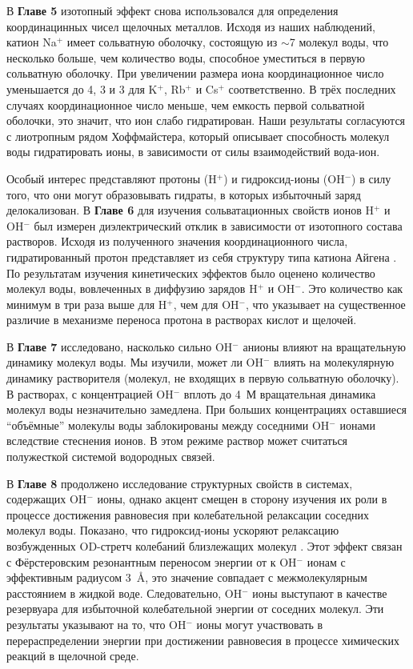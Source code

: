 В \textbf{Главе 5} изотопный эффект снова использовался для определения координацинных чисел щелочных металлов. Исходя из наших наблюдений, катион Na$^+$ имеет сольватную оболочку, состоящую из  $\sim$7 молекул воды, что несколько больше, чем количество воды, способное уместиться в первую сольватную оболочку. При увеличении размера иона координационное число уменьшается до 4, 3 и 3 для K$^+$, Rb$^+$ и Cs$^+$ соответственно. В трёх последних случаях координационное число меньше, чем емкость первой сольватной оболочки, это значит, что ион слабо гидратирован. Наши результаты согласуются с лиотропным рядом Хоффмайстера, который описывает способность молекул воды гидратировать ионы, в зависимости от силы взаимодействий вода-ион.

Особый интерес представляют протоны (H$^+$) и гидроксид-ионы (OH$^-$) в силу того, что они могут образовывать гидраты, в которых избыточный заряд делокализован. В \textbf{Главе 6} для изучения сольватационных свойств ионов H$^+$ и OH$^-$ был измерен диэлектрический отклик в зависимости от изотопного состава растворов. Исходя из полученного значения координационного числа, гидратированный протон представляет из себя структуру типа катиона Айгена . По результатам изучения кинетических эффектов было оценено количество молекул воды, вовлеченных в диффузию зарядов H$^+$ и OH$^-$. Это количество как минимум в три раза выше для H$^+$, чем для OH$^-$, что указывает на существенное различие в механизме переноса протона в растворах кислот и щелочей. 

В \textbf{Главе 7} исследовано, насколько сильно OH$^-$ анионы влияют на вращательную динамику молекул воды. Мы изучили, может ли OH$^-$ влиять на молекулярную динамику растворителя (молекул, не входящих в первую сольватную оболочку). В растворах, с концентрацией OH$^-$ вплоть до 4~М вращательная динамика молекул воды незначительно замедлена. При больших концентрациях оставшиеся ``объёмные'' молекулы воды заблокированы между соседними OH$^-$ ионами вследствие стеснения ионов. В этом режиме раствор может считаться полужесткой системой водородных связей. 

В \textbf{Главе 8} продолжено исследование структурных свойств в системах, содержащих OH$^-$ ионы, однако акцент смещен в сторону изучения их роли в процессе достижения равновесия при колебательной релаксации соседних молекул воды. Показано, что гидроксид-ионы ускоряют релаксацию возбужденных OD-стретч колебаний близлежащих молекул . Этот эффект связан с Фёрстеровским резонантным переносом энергии от  к OH$^-$  ионам с эффективным радиусом 3~\AA, это значение совпадает с межмолекулярным расстоянием в жидкой воде. Следовательно, OH$^-$ ионы выступают в качестве резервуара для избыточной колебательной энергии от соседних молекул. Эти результаты указывают на то, что OH$^-$ ионы могут участвовать в перераспределении энергии при достижении равновесия в процессе химических реакций в щелочной среде. 

